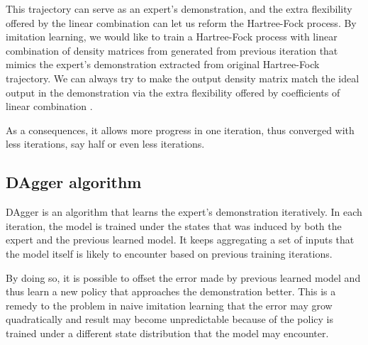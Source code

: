 \documentclass[twoside]{article}
\begin{document}
This trajectory can serve as an expert's demonstration, and the extra flexibility offered by the linear combination can let us reform the Hartree-Fock process. By imitation learning, we would like to train a Hartree-Fock process with linear combination of density matrices from generated from previous iteration that mimics the expert's demonstration extracted from original Hartree-Fock trajectory. We can always try to make the output density matrix match the ideal output in the demonstration via the extra flexibility offered by coefficients of linear combination .


As a consequences, it allows more progress in one iteration, thus converged with less iterations, say half or even less iterations.  







\subsection{DAgger algorithm}
DAgger is an algorithm that learns the expert's demonstration iteratively. In each iteration, the model is trained under the states that was induced by both the expert and the previous learned model. It keeps aggregating a set of inputs that the model itself is likely to encounter based on previous training iterations.  

By doing so, it is possible to offset the error made by previous learned model and thus learn a new policy that approaches the demonstration better. This is a remedy to the problem in naive imitation learning that the error may grow quadratically and result may become unpredictable because of the policy is trained under a different state distribution that the model may encounter. 
\end{document}
